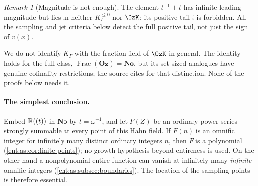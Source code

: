 \documentclass[11pt]{article}
\theoremstyle{plain}
\theoremstyle{plain}
\theoremstyle{plain}
\theoremstyle{definition}
\theoremstyle{definition}
\theoremstyle{definition}
\theoremstyle{definition}
\theoremstyle{remark}
\newtheorem{remark}[remark]{Remark}
\newcommand{\No}{\mathbf{No}}
\newcommand{\K}{K_\Gamma}\newcommand{\KD}{K_\Delta}
\newcommand{\Oz}{\mathbf{Oz}}\newcommand{\Ed}{\mathcal E_{\Gamma,d}}
\newcommand{\Kle}{K_\Gamma^{\le0}}\DeclareMathOperator{\Jac}{Jac}
\begin{document}
\begin{remark}[Magnitude is not enough]\label{ent:as:rem:magnitude}
The element $t^{-1}+t$ has infinite leading magnitude but lies in neither
$\Kle$ nor $\OzK$: its positive tail $t$ is forbidden. All the sampling and jet
criteria below detect the full positive tail, not just the sign of $v(x)$.
\end{remark}

We do not identify $\K$ with the fraction field of $\OzK$ in general. The
identity holds for the full class, $\operatorname{Frac}(\Oz)=\No$, but its
set-sized analogues have genuine cofinality restrictions; the source cites
\cite[Proposition~2.4.5]{LInnocenteMantova} for that distinction. None of the
proofs below needs it.

\paragraph{The simplest conclusion.} Embed $\mathbb R((t))$ in $\No$ by
$t=\omega^{-1}$, and let $F(Z)$ be an ordinary power series strongly summable
at every point of this Hahn field. If $F(n)$ is an omnific integer for
infinitely many distinct ordinary integers $n$, then $F$ is a polynomial
(\cref{ent:as:cor:finite-points}); no growth hypothesis beyond entireness is
used. On the other hand a nonpolynomial entire function can vanish at
infinitely many \emph{infinite} omnific integers
(\cref{ent:as:subsec:boundaries}). The location of the sampling points is
therefore essential.
\end{document}
